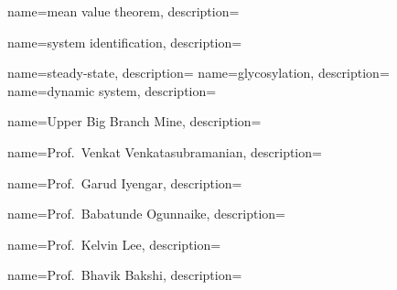 	{
		name={mean value theorem},
		description={}
	}	

	{
		name={system identification},
		description={}
	}	
	
	{
		name={steady-state},
		description={}
	}		
	{
		name={glycosylation},
		description={}
	}	
	{
		name={dynamic system},
		description={}
	}				
	
	
	{
		name={Upper Big Branch Mine},
		description={}
	}

	{
		name={Prof.~Venkat Venkatasubramanian},
		description={}
	}

	{
		name={Prof.~Garud Iyengar},
		description={}
	}
	
	{
		name={Prof.~Babatunde Ogunnaike},
		description={}
	}

	{
		name={Prof.~Kelvin Lee},
		description={}
	}

	{
		name={Prof.~Bhavik Bakshi},
		description={}
	}








